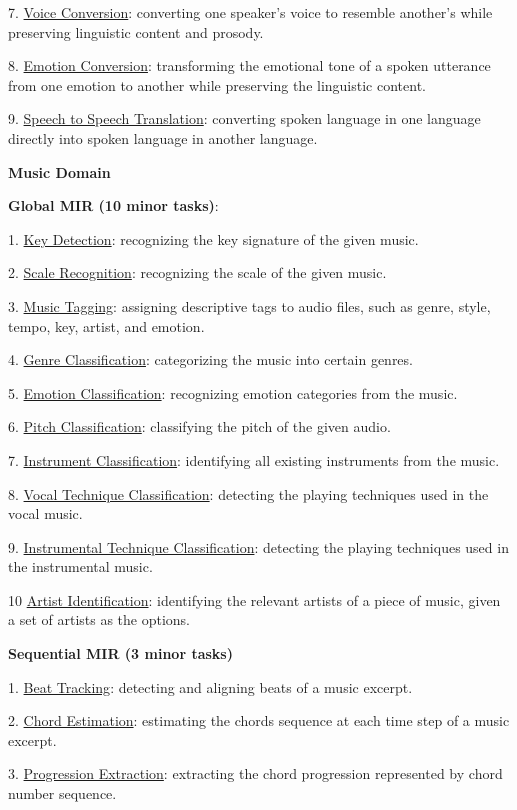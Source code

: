 7. \underline{Voice Conversion}: converting one speaker's voice to resemble another's while preserving linguistic content and prosody.

8. \underline{Emotion Conversion}: transforming the emotional tone of a spoken utterance from one emotion to another while preserving the linguistic content. 

9. \underline{Speech to Speech Translation}: converting spoken language in one language directly into spoken language in another language.

\begin{center}
\textbf{Music Domain}
\end{center}

\textbf{Global MIR (10 minor tasks)}: 

1. \underline{Key Detection}: recognizing the key signature of the given music.

2. \underline{Scale Recognition}: recognizing the scale of the given music.

3. \underline{Music Tagging}: assigning descriptive tags to audio files, such as genre, style, tempo, key, artist, and emotion.

4. \underline{Genre Classification}: categorizing the music into certain genres.

5. \underline{Emotion Classification}: recognizing emotion categories from the music.

6. \underline{Pitch Classification}: classifying the pitch of the given audio.

7. \underline{Instrument Classification}: identifying all existing instruments from the music.

8. \underline{Vocal Technique Classification}: detecting the playing techniques used in the vocal music.

9. \underline{Instrumental Technique Classification}: detecting the playing techniques used in the instrumental music.

10 \underline{Artist Identification}: identifying the relevant artists of a piece of music, given a set of artists as the options.

\textbf{Sequential MIR (3 minor tasks)}

1. \underline{Beat Tracking}: detecting and aligning beats of a music excerpt.

2. \underline{Chord Estimation}: estimating the chords sequence at each time step of a music excerpt.

3. \underline{Progression Extraction}: extracting the chord progression represented by chord number sequence. 


